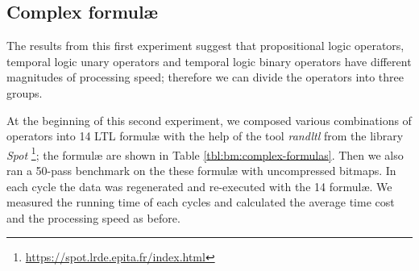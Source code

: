 
\subsection{Complex formul\ae{}} %

The results from this first experiment suggest that propositional logic operators, temporal logic unary operators and temporal logic binary operators have different magnitudes of processing speed; therefore we can divide the operators into three groups.

At the beginning of this second experiment, we composed various combinations of operators into 14 LTL formul\ae{} with the help of the tool \emph{randltl} from the library \textit{Spot} \footnote{\url{https://spot.lrde.epita.fr/index.html}}; the formul\ae{} are shown in Table \ref{tbl:bm:complex-formulas}. Then we also ran a 50-pass benchmark on the these formul\ae{} with uncompressed bitmaps. In each cycle the data was regenerated and re-executed with the 14 formul\ae{}. We measured the running time of each cycles and calculated the average time cost and the processing speed as before.


